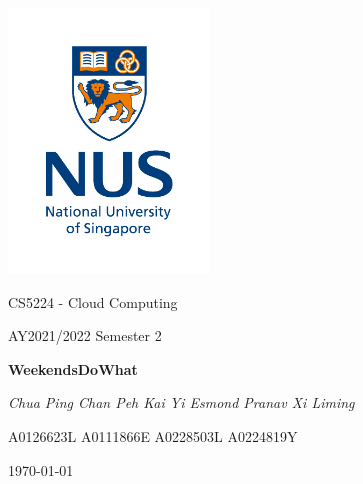 \documentclass[12pt,a4paper]{article}
\begin{document}
\begin{titlepage}
  \centering
  
  \includegraphics[width=0.4\textwidth]{figures/nus.jpg}

  {\LARGE {CS5224 - Cloud Computing} \par}
  {\Large {AY2021/2022 Semester 2} \par}
  
  \vspace{1cm}
  {\LARGE \bf{WeekendsDoWhat} \par}

  \vspace{1.5cm}
  {\large \textit{Chua Ping Chan \qquad Peh Kai Yi Esmond \qquad Pranav \qquad Xi Liming} \par}
  {\hspace{0.6cm} A0126623L \hspace{2.5cm} A0111866E \hspace{1.6cm} A0228503L \hspace{0.6cm} A0224819Y \par}

  
  \vspace{2cm}
  \today    

  \vfill
\end{titlepage}

\renewcommand{\contentsname}{Table of Contents}	%
\tableofcontents
\thispagestyle{empty}
\end{document}
